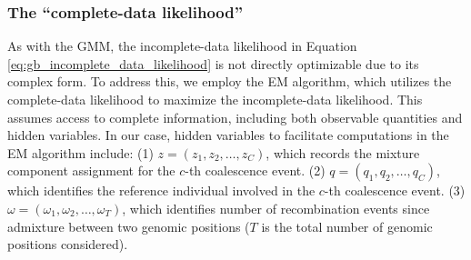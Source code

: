 \subsubsection{The ``complete-data likelihood''}

As with the GMM, the incomplete-data likelihood in Equation \ref{eq:gb_incomplete_data_likelihood} is not directly optimizable due to its complex form. To address this, we employ the EM algorithm, which utilizes the complete-data likelihood to maximize the incomplete-data likelihood. This assumes access to complete information, including both observable quantities and hidden variables. In our case, hidden variables to facilitate computations in the EM algorithm include: (1) \( z = (z_1, z_2, \ldots, z_C) \), which records the mixture component assignment for the $c$-th coalescence event. (2) \( q = (q_1, q_2, \ldots, q_C) \), which identifies the reference individual involved in the $c$-th coalescence event. (3) $\omega = (\omega_1, \omega_2, \ldots, \omega_T)$, which identifies number of recombination events since admixture between two genomic positions ($T$ is the total number of genomic positions considered). 

